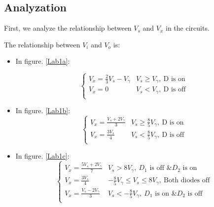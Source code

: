     \subsection{Analyzation}
    First, we analyze the relationship between $V_s$ and $V_x$ in the circuits.\par
    The relationship between $V_i$ and $V_o$ is:\par
    \begin{itemize}
        \item In figure. \ref{Lab1a}:\par
        \begin{equation}
            \begin{cases}
                V_x = \frac{2}{3}V_s - V_\gamma & V_s \ge V_\gamma,~\text{D is on}\\
                V_x = 0 & V_s < V_\gamma,~\text{D is off}\\
            \end{cases}
        \label{l1eq1}
        \end{equation}
        
        \item In figure. \ref{Lab1b}:
        \begin{equation}
            \begin{cases}
                V_x = \frac{V_s+2V_\gamma}{3} & V_s\ge \frac{8}{5}V_\gamma,~\text{D is on}\\
                V_x = \frac{3V_s}{4} & V_s < \frac{8}{5}V_\gamma,~\text{D is off}\\
            \end{cases}
        \label{l1eq2}
        \end{equation}
            
        \item In figure. \ref{Lab1c}:
        \begin{equation}
            \begin{cases}
                V_x = \frac{5V_s+2V_\gamma}{7} & V_s > 8V_\gamma,~\text{$D_1$ is off \& $D_2$ is on}\\
                V_x = \frac{3V_s}{4} & -\frac{8}{5}V_\gamma \le V_s \le 8V_\gamma,~\text{Both diodes off}\\
                V_x = \frac{V_s-2V_\gamma}{3} & V_s < -\frac{8}{5}V_\gamma,~\text{$D_1$ is on \& $D_2$ is off}\\
            \end{cases}
        \label{l1eq3}
        \end{equation}
            

\end{itemize}
